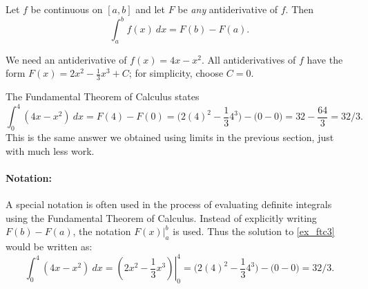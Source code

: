 {Let $f$ be continuous on $[a,b]$ and let $F$ be \textit{any} antiderivative of $f$. Then \[\int_a^b f(x)\ dx = F(b) - F(a).\]}



{We need an antiderivative of $f(x)=4x-x^2$. All antiderivatives of $f$ have the form $F(x) = 2x^2-\frac13x^3+C$; for simplicity, choose $C=0$.

The Fundamental Theorem of Calculus states
\[
\int_0^4(4x-x^2)\ dx = F(4)-F(0)
= \big(2(4)^2-\frac134^3\big)-\big(0-0\big) = 32-\frac{64}3 = 32/3.
\]
This is the same answer we obtained using limits in the previous section, just with much less work.}

\paragraph{Notation:}%
A special notation is often used in the process of evaluating definite integrals using the Fundamental Theorem of Calculus. Instead of explicitly writing $F(b)-F(a)$, the notation $F(x)\Big|_a^b$ is used. Thus the solution to \autoref{ex_ftc3} would be written as:
\[
\int_0^4(4x-x^2)\ dx = \left.\left(2x^2-\frac13x^3\right)\right|_0^4
= \big(2(4)^2-\frac134^3\big)-\big(0-0\big) =  32/3.
\]

